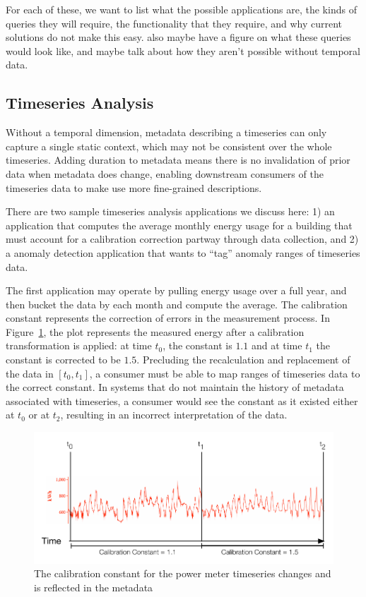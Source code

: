 For each of these, we want to list what the possible applications are,
the kinds of queries they will require, the functionality that they require,
and why current solutions do not make this easy. also maybe have a figure
on what these queries would look like, and maybe talk about how they aren't possible
without temporal data.
\fi

\subsection{Timeseries Analysis} \label{subsection:timeseriesanalysis}

Without a temporal dimension, metadata describing a timeseries can only
capture a single static context, which may not be consistent over the
whole timeseries. Adding duration to metadata means there is no invalidation
of prior data when metadata does change, enabling downstream consumers
of the timeseries data to make use more fine-grained descriptions.

There are two sample timeseries analysis applications we discuss here: 1) an
application that computes the average monthly energy usage for a building that
must account for a calibration correction partway through data collection, and
2) a anomaly detection application that wants to ``tag'' anomaly ranges of
timeseries data.

The first application may operate by pulling energy usage over a full year,
and then bucket the data by each month and compute the average. The calibration
constant represents the correction of errors in the measurement process. In Figure~\ref{fig:calibrationconstant},
the plot represents the measured energy after a calibration transformation is applied: at time $t_0$, the constant
is $1.1$ and at time $t_1$ the constant is corrected to be $1.5$. Precluding the recalculation and replacement
of the data in $[t_0, t_1]$, a consumer must be able to map ranges of timeseries data to the correct
constant. In systems that do not maintain the history of metadata associated with timeseries, a consumer would
see the constant as it existed either at $t_0$ or at $t_2$, resulting in an incorrect interpretation of the data.

\begin{figure}
\centering
\includegraphics[width=.9\linewidth]{figs/calibrationconstant.pdf}
\caption{The calibration constant for the power meter timeseries changes and is reflected
in the metadata}
\label{fig:calibrationconstant}
\end{figure}

